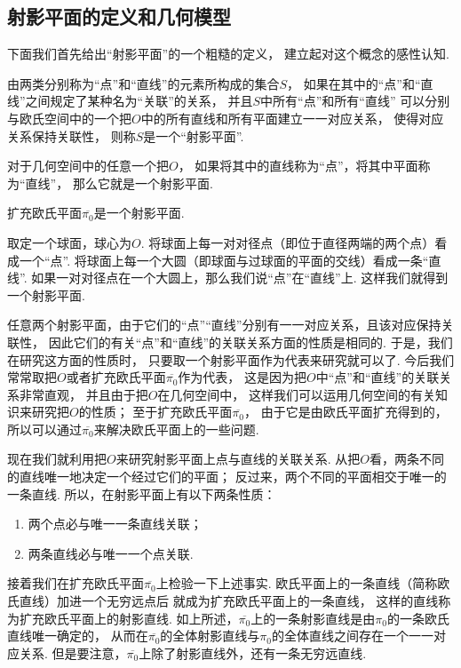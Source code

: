 \subsection{射影平面的定义和几何模型}
下面我们首先给出“射影平面”的一个粗糙的定义，
建立起对这个概念的感性认知.

由两类分别称为“点”和“直线”的元素所构成的集合\(S\)，
如果在其中的“点”和“直线”之间规定了某种名为“关联”的关系，
并且\(S\)中所有“点”和所有“直线”
可以分别与欧氏空间中的一个把\(O\)中的所有直线和所有平面建立一一对应关系，
使得对应关系保持关联性，
则称\(S\)是一个“射影平面”.

对于几何空间中的任意一个把\(O\)，
如果将其中的直线称为“点”，将其中平面称为“直线”，
那么它就是一个射影平面.

扩充欧氏平面\(\overline{\pi_0}\)是一个射影平面.

取定一个球面，球心为\(O\).
将球面上每一对{对径点}（即位于直径两端的两个点）看成一个“点”.
将球面上每一个大圆（即球面与过球面的平面的交线）看成一条“直线”.
如果一对对径点在一个大圆上，那么我们说“点”在“直线”上.
这样我们就得到一个射影平面.

任意两个射影平面，由于它们的“点”“直线”分别有一一对应关系，且该对应保持关联性，
因此它们的有关“点”和“直线”的关联关系方面的性质是相同的.
于是，我们在研究这方面的性质时，
只要取一个射影平面作为代表来研究就可以了.
今后我们常常取把\(O\)或者扩充欧氏平面\(\overline{\pi_0}\)作为代表，
这是因为把\(O\)中“点”和“直线”的关联关系非常直观，
并且由于把\(O\)在几何空间中，
这样我们可以运用几何空间的有关知识来研究把\(O\)的性质；
至于扩充欧氏平面\(\overline{\pi_0}\)，
由于它是由欧氏平面扩充得到的，
所以可以通过\(\overline{\pi_0}\)来解决欧氏平面上的一些问题.

现在我们就利用把\(O\)来研究射影平面上点与直线的关联关系.
从把\(O\)看，两条不同的直线唯一地决定一个经过它们的平面；
反过来，两个不同的平面相交于唯一的一条直线.
所以，在射影平面上有以下两条性质：
\begin{enumerate}
	\item 两个点必与唯一一条直线关联；
	\item 两条直线必与唯一一个点关联.
\end{enumerate}

接着我们在扩充欧氏平面\(\overline{\pi_0}\)上检验一下上述事实.
欧氏平面上的一条直线（简称欧氏直线）加进一个无穷远点后
就成为扩充欧氏平面上的一条直线，
这样的直线称为扩充欧氏平面上的射影直线.
如上所述，\(\overline{\pi_0}\)上的一条射影直线是由\(\pi_0\)的一条欧氏直线唯一确定的，
从而在\(\overline{\pi_0}\)的全体射影直线与\(\pi_0\)的全体直线之间存在一个一一对应关系.
但是要注意，\(\overline{\pi_0}\)上除了射影直线外，还有一条无穷远直线.

